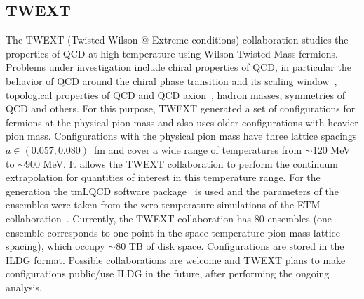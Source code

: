 \documentclass[a4paper,11pt]{article}
\begin{document}
\subsection{TWEXT}
The TWEXT (Twisted Wilson @ Extreme conditions) collaboration studies
the properties of QCD at high temperature using Wilson Twisted Mass
fermions. Problems under investigation include chiral properties of
QCD, in particular the behavior of QCD around the chiral phase
transition and its scaling window~\cite{Kotov:2021rah}, topological
properties of QCD and QCD axion~\cite{Kotov:2021ujj}, hadron masses,
symmetries of QCD and others. For this purpose, TWEXT generated a set
of configurations for  fermions at the physical pion mass
and also uses older configurations with heavier pion
mass. Configurations with the physical pion mass have three lattice
spacings $a\in(0.057,0.080)$~fm and cover a wide range of temperatures
from $\sim120$ MeV to $\sim900$ MeV. It allows the TWEXT collaboration
to perform the continuum extrapolation for quantities of interest in
this temperature range. For the generation the tmLQCD software
package~\cite{Jansen:2009xp,Deuzeman:2013xaa,Abdel-Rehim:2013wba} is
used and the parameters of the ensembles were taken from the zero
temperature simulations of the ETM
collaboration~\cite{Alexandrou:2018egz}. Currently, the TWEXT
collaboration has 80 ensembles (one ensemble corresponds to one point
in the space temperature-pion mass-lattice spacing), which occupy
$\sim80$ TB of disk space. Configurations are stored in the ILDG
format. Possible collaborations are welcome and TWEXT plans to make
configurations public/use ILDG in the future, after performing the
ongoing analysis.
\end{document}

